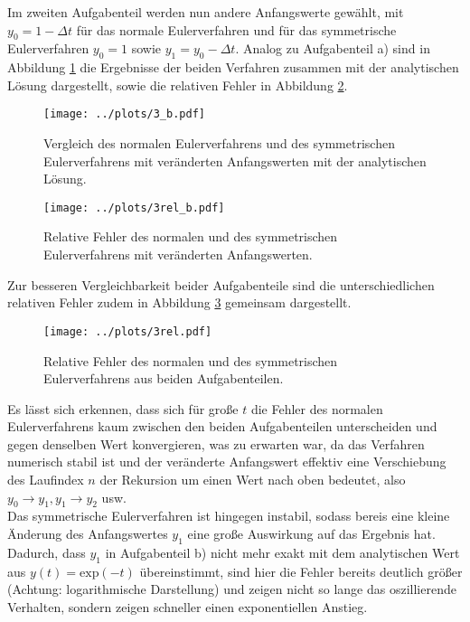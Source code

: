 Im zweiten Aufgabenteil werden nun andere Anfangswerte gewählt, mit $y_0=1-\Delta t$ für das normale Eulerverfahren und für das symmetrische Eulerverfahren $y_0=1$ sowie $y_1=y_0-\Delta t$. Analog zu Aufgabenteil a) sind in Abbildung \ref{fig:Eulervergleich_b} die Ergebnisse der beiden Verfahren zusammen mit der analytischen Lösung dargestellt, sowie die relativen Fehler in Abbildung \ref{fig:eulerrel_b}.
\begin{figure}[H]
  \centering
  \texttt{[image: ../plots/3\_b.pdf]}
  \caption{Vergleich des normalen Eulerverfahrens und des symmetrischen Eulerverfahrens mit veränderten Anfangswerten mit der analytischen Lösung.}
  \label{fig:Eulervergleich_b}
\end{figure}
\begin{figure}[H]
  \centering
  \texttt{[image: ../plots/3rel\_b.pdf]}
  \caption{Relative Fehler des normalen und des symmetrischen Eulerverfahrens mit veränderten Anfangswerten.}
  \label{fig:eulerrel_b}
\end{figure}
Zur besseren Vergleichbarkeit beider Aufgabenteile sind die unterschiedlichen relativen Fehler zudem in
Abbildung \ref{fig:alle} gemeinsam dargestellt.
\begin{figure}[H]
  \centering
  \texttt{[image: ../plots/3rel.pdf]}
  \caption{Relative Fehler des normalen und des symmetrischen Eulerverfahrens aus beiden Aufgabenteilen.}
  \label{fig:alle}
\end{figure}
Es lässt sich erkennen, dass sich für große $t$ die Fehler des normalen Eulerverfahrens kaum zwischen den beiden Aufgabenteilen unterscheiden und gegen denselben Wert konvergieren, was zu erwarten war, da das Verfahren numerisch stabil ist und der veränderte Anfangswert effektiv eine Verschiebung des Laufindex $n$ der Rekursion um einen Wert nach oben bedeutet, also $y_0\to y_1, y_1\to y_2$ usw. \\
Das symmetrische Eulerverfahren ist hingegen instabil, sodass bereis eine kleine Änderung des Anfangswertes
$y_1$ eine große Auswirkung auf das Ergebnis hat. Dadurch, dass $y_1$ in Aufgabenteil b) nicht mehr exakt mit dem analytischen Wert aus $y(t)=\text{exp}(-t)$ übereinstimmt, sind hier die Fehler bereits deutlich größer (Achtung: logarithmische Darstellung) und zeigen nicht so lange das oszillierende Verhalten, sondern zeigen schneller einen exponentiellen Anstieg.


